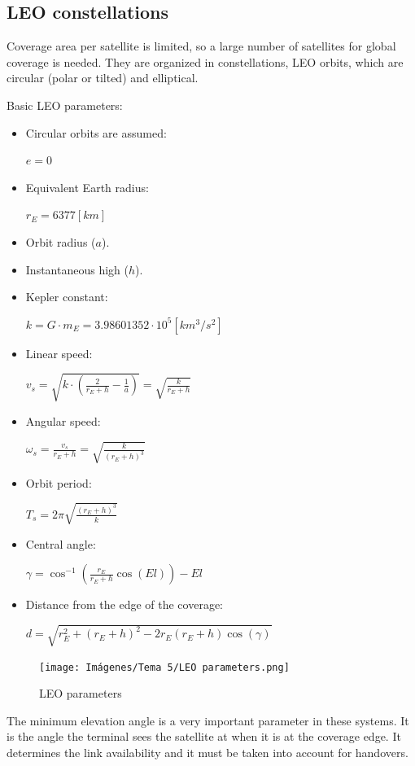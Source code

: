 \documentclass[
	12pt,
	twoside
]{book}
\begin{document}
\subsection{LEO constellations}

Coverage area per satellite is limited, so a large number of satellites for global coverage is needed. They are organized in constellations, LEO orbits, which are circular (polar or tilted) and elliptical.

Basic LEO parameters:
\begin{itemize}
	\item {
		Circular orbits are assumed:

		$e = 0$
	}
	\item {
		Equivalent Earth radius:

		$r_E = 6377 [km]$
	}
	\item {
		Orbit radius ($a$).
	}
	\item {
		Instantaneous high ($h$).
	}
	\item {
		Kepler constant:

		$k = G \cdot m_E = 3.98601352 \cdot 10^5 [km^3/s^2]$
	}
	\item {
		Linear speed:

		$v_s =
		\sqrt {k \cdot \left( \frac {2} {r_E + h} - \frac {1} {a} \right)} =
		\sqrt {\frac {k} {r_E + h}}$
	}
	\item {
		Angular speed:

		$\omega_s =
		\frac {v_s} {r_E + h} =
		\sqrt {\frac {k} {(r_E + h)^3}}$
	}
	\item {
		Orbit period:

		$T_s =
		2 \pi \sqrt{ \frac {(r_E + h)^3} {k} }$
	}
	\item {
		Central angle:

		$\gamma = \cos^{-1} \left( \frac {r_E} {r_E + h} \cos(El) \right) - El$
	}
	\item {
		Distance from the edge of the coverage:

		$d = \sqrt{r_{E}^2 + (r_E + h)^2 - 2 r_E (r_E + h) \cos(\gamma)}$
	}
\end{itemize}

\begin{figure}[H]
	\centering
	\texttt{[image: Imágenes/Tema 5/LEO parameters.png]}
	\caption{
		\label{fig:unit5_LEO_param}
		LEO parameters
	}
\end{figure}

The minimum elevation angle is a very important parameter in these systems. It is the angle the terminal sees the satellite at when it is at the coverage edge. It determines the link availability and it must be taken into account for handovers.
\end{document}
